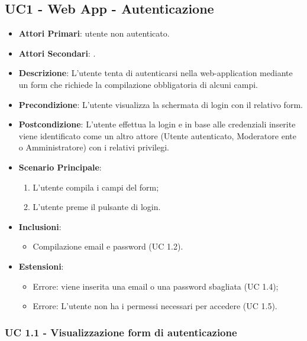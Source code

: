 	\subsection{UC1 - Web App - Autenticazione}
		
	\begin{itemize}
		\item \textbf{Attori Primari}: utente non autenticato.
		\item \textbf{Attori Secondari}: .
		\item \textbf{Descrizione}: L'utente tenta di autenticarsi nella web-application mediante un form che richiede la compilazione obbligatoria di alcuni campi.
		\item \textbf{Precondizione}: L'utente visualizza la schermata di login con il relativo form.
		\item \textbf{Postcondizione}: L'utente effettua la login e in base alle credenziali inserite viene identificato come un altro attore (Utente autenticato, Moderatore ente o Amministratore) con i relativi privilegi.
		\item \textbf{Scenario Principale}:
		\begin{enumerate}
			\item L'utente compila i campi del form;
			\item L'utente preme il pulsante di login.
		\end{enumerate}
		\item \textbf{Inclusioni}:
			\begin{itemize}
				\item Compilazione email e password (UC 1.2).
			\end{itemize}
		\item \textbf{Estensioni}:
			\begin{itemize}
				\item Errore: viene inserita una email o una password sbagliata (UC 1.4);
				\item Errore: L'utente non ha i permessi necessari per accedere (UC 1.5).
			\end{itemize}
	\end{itemize}
	

		\subsubsection{UC 1.1 - Visualizzazione form di autenticazione}

